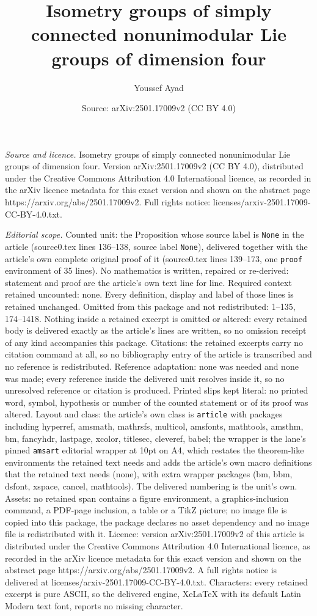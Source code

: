 \documentclass[10pt,a4paper]{amsart}
\title[Isometry groups of simply connected nonunimodular Lie groups]{Isometry groups of simply connected nonunimodular Lie groups of dimension four}
\author{Youssef Ayad}
\date{Source: arXiv:2501.17009v2 (CC BY 4.0)}
\begin{document}
\maketitle

\noindent\emph{Source and licence.} Isometry groups of simply connected nonunimodular Lie groups of dimension four. Version arXiv:2501.17009v2 (CC BY 4.0), distributed under the Creative Commons Attribution 4.0 International licence, as recorded in the arXiv licence metadata for this exact version and shown on the abstract page https://arxiv.org/abs/2501.17009v2. Full rights notice: licenses/arxiv-2501.17009-CC-BY-4.0.txt.\par\smallskip

\noindent\textit{Editorial scope.} Counted unit: the Proposition whose source label is \texttt{None} in the article (source0.tex lines 136--138, source label \texttt{None}), delivered together with the article's own complete original proof of it (source0.tex lines 139--173, one \texttt{proof} environment of 35 lines). No mathematics is written, repaired or re-derived: statement and proof are the article's own text line for line. Required context retained uncounted: none. Every definition, display and label of those lines is retained unchanged. Omitted from this package and not redistributed: 1--135, 174--1418. Nothing inside a retained excerpt is omitted or altered: every retained body is delivered exactly as the article's lines are written, so no omission receipt of any kind accompanies this package. Citations: the retained excerpts carry no citation command at all, so no bibliography entry of the article is transcribed and no reference is redistributed. Reference adaptation: none was needed and none was made; every reference inside the delivered unit resolves inside it, so no unresolved reference or citation is produced. Printed slips kept literal: no printed word, symbol, hypothesis or number of the counted statement or of its proof was altered. Layout and class: the article's own class is \texttt{article} with packages including hyperref, amsmath, mathrsfs, multicol, amsfonts, mathtools, amsthm, bm, fancyhdr, lastpage, xcolor, titlesec, cleveref, babel; the wrapper is the lane's pinned \texttt{amsart} editorial wrapper at 10pt on A4, which restates the theorem-like environments the retained text needs and adds the article's own macro definitions that the retained text needs (none), with extra wrapper packages (bm, bbm, dsfont, xspace, cancel, mathtools). The delivered numbering is the unit's own. Assets: no retained span contains a figure environment, a graphics-inclusion command, a PDF-page inclusion, a table or a TikZ picture; no image file is copied into this package, the package declares no asset dependency and no image file is redistributed with it. Licence: version arXiv:2501.17009v2 of this article is distributed under the Creative Commons Attribution 4.0 International licence, as recorded in the arXiv licence metadata for this exact version and shown on the abstract page https://arxiv.org/abs/2501.17009v2. A full rights notice is delivered at licenses/arxiv-2501.17009-CC-BY-4.0.txt. Characters: every retained excerpt is pure ASCII, so the delivered engine, XeLaTeX with its default Latin Modern text font, reports no missing character.
\end{document}
